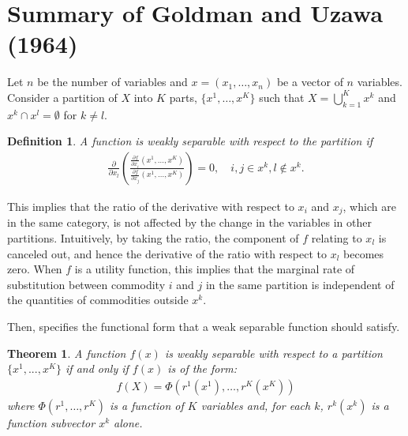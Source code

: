 \documentclass[11pt, a4paper]{article}
\newtheorem{theorem}{Theorem}
\newtheorem{definition}{Definition}
\begin{document}
\section{Summary of Goldman and Uzawa (1964)}\label{appendix:summary_goldman_uzawa}

Let $n$ be the number of variables and $x = (x_{1},\ldots, x_{n})$ be a vector of $n$ variables.
Consider a partition of $X$ into $K$ parts, $\{x^1, \ldots, x^K\}$ such that $X = \bigcup_{k=1}^K x^k$ and $x^k \cap x^l = \emptyset$ for $k\ne l$.
\begin{definition}\label{def:weal_separable}
    A function is weakly separable with respect to the partition if 
    \begin{align}
        \frac{\partial}{\partial x_l}\left(\frac{\frac{\partial f}{\partial x_i}(x^1, \ldots, x^K)}{\frac{\partial f}{\partial x_j}(x^1, \ldots, x^K)}\right) = 0, \quad i,j\in x^k, l \notin x^k.
    \end{align}
\end{definition}
This implies that the ratio of the derivative with respect to $x_i$ and $x_j$, which are in the same category, is not affected by the change in the variables in other partitions.
Intuitively, by taking the ratio, the component of $f$ relating to $x_l$ is canceled out, and hence the derivative of the ratio with respect to $x_l$ becomes zero.
When $f$ is a utility function, this implies that the marginal rate of substitution between commodity $i$ and $j$ in the same partition is independent of the quantities of commodities outside $x^k$.

Then, \citet{goldmanNote1964} specifies the functional form that a weak separable function should satisfy.
\begin{theorem}\label{thorem_2_GU}
    A function $f(x)$ is weakly separable with respect to a partition $\{x^1, .. ., x^K\}$ if and only if $f(x)$ is of the form: 
    \begin{align}
        f(X) = \Phi(r^1(x^{1}),\ldots, r^K(x^{K})   )
    \end{align} where $\Phi(r^1,\ldots, r^K)$ is a function of $K$ variables and, for each $k$, $r^k(x^{k})$ is a function subvector $x^{k}$ alone.
\end{theorem}
\end{document}

